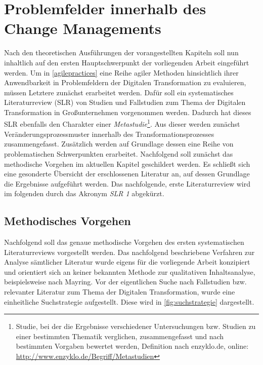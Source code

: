\chapter{Problemfelder innerhalb des Change Managements}
\label{problemfields}


Nach den theoretischen Ausführungen der vorangestellten Kapiteln soll nun inhaltlich auf den ersten Hauptschwerpunkt der vorliegenden Arbeit eingeführt werden. Um in \ref{agilepractices} eine Reihe agiler Methoden hinsichtlich ihrer Anwendbarkeit in Problemfeldern der Digitalen Transformation zu evaluieren, müssen Letztere zunächst erarbeitet werden. Dafür soll ein systematisches Literaturreview (\gls{SLR}) von Studien und Fallstudien zum Thema der Digitalen Transformation in Großunternehmen vorgenommen werden. Dadurch hat dieses SLR ebenfalls den Charakter einer \textit{Metastudie}\footnote{Studie, bei der die Ergebnisse verschiedener Untersuchungen bzw. Studien zu einer bestimmten Thematik verglichen, zusammengefasst und nach bestimmten Vorgaben bewertet werden, Definition nach enzyklo.de, online: \url{http://www.enzyklo.de/Begriff/Metastudien}}. Aus dieser werden zunächst Veränderungsprozessmuster innerhalb des Transformationsprozesses  zusammengefasst.  Zusätzlich werden auf Grundlage dessen eine Reihe von problematischen Schwerpunkten erarbeitet. Nachfolgend soll zunächst das methodische Vorgehen im aktuellen Kapitel geschildert werden. Es schließt sich eine gesonderte Übersicht der erschlossenen Literatur an, auf dessen Grundlage  die Ergebnisse aufgeführt werden.  Das nachfolgende, erste Literaturreview wird im folgenden durch das Akronym \textit{SLR 1} abgekürzt.

\section{Methodisches Vorgehen}
\label{problemfields:methods}


Nachfolgend soll das genaue methodische Vorgehen des ersten systematischen Literaturreviews vorgestellt werden. Das nachfolgend beschriebene Verfahren zur Analyse sämtlicher Literatur wurde eigens für  die vorliegende  Arbeit konzipiert und orientiert sich an keiner bekannten Methode zur qualitativen Inhaltsanalyse, beispielsweise nach Mayring. Vor der eigentlichen Suche nach Fallstudien bzw. relevanter Literatur zum Thema der Digitalen Transformation, wurde eine einheitliche Suchstrategie aufgestellt. Diese wird in \ref{fig:suchstrategie} dargestellt. 

